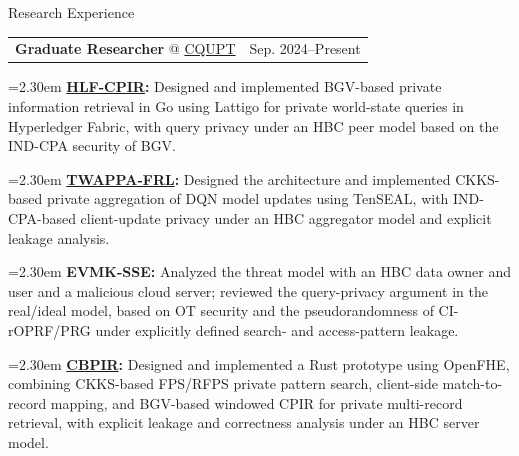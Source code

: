 \documentclass[11pt,a4paper]{article}
\makeatletter
\newcommand{\cvrow}[2]{%
  \noindent
  \begin{minipage}[t]{0.145\textwidth}
    \vspace{0pt}%
    \raggedright
    \fontsize{10.5}{12.5}\selectfont
    #1
  \end{minipage}%
  \hfill
  \begin{minipage}[t]{0.835\textwidth}
    \vspace{0pt}%
    #2
  \end{minipage}\par
}
\newcommand{\workentry}[2]{%
  \noindent
  \begin{tabularx}{\linewidth}
    {@{}X@{\hspace{0.8em}}r@{}}
    #1 & \small #2
  \end{tabularx}\par
  \vspace{0.15em}
}
\newcommand{\workproject}[1]{%
  \noindent
  \hangindent=2.30em
  \hangafter=1
  \hspace*{1.15em}\makebox[1.15em][l]{$\diamond$}#1\par
  \vspace{0.12em}
}
\makeatother
\begin{document}
\vspace{0.75em}

\cvrow{Research Experience}{%
  \workentry
    {\textbf{Graduate Researcher} @
    \href{https://www.cqupt.edu.cn/}{CQUPT}}
    {Sep. 2024--Present}

  \workproject{\textbf{\href{https://github.com/iasenovets/2_2_HLF_CPIR}{HLF-CPIR}:}
  Designed and implemented BGV-based private information retrieval in Go using
  Lattigo for private world-state queries in Hyperledger Fabric,
  with query privacy under an HBC peer model based on the IND-CPA security of BGV.}

  \workproject{\textbf{\href{https://github.com/hetiantian10/TWAPPA-FRL}{TWAPPA-FRL}:}
  Designed the architecture and implemented CKKS-based
  private aggregation of DQN model updates using TenSEAL, with IND-CPA-based
  client-update privacy under an HBC aggregator model and explicit leakage analysis.}

  \workproject{\textbf{EVMK-SSE:} Analyzed the threat model with an HBC data owner
  and user and a malicious cloud server; reviewed the query-privacy argument in the
  real/ideal model, based on OT security and the pseudorandomness of CI-rOPRF/PRG under explicitly
  defined search- and access-pattern leakage.}




  \workproject{\textbf{\href{https://github.com/iasenovets/content-based-pir}{CBPIR}:}
  Designed and implemented a Rust prototype using OpenFHE, combining
  CKKS-based FPS/RFPS private pattern search, client-side match-to-record
  mapping, and BGV-based windowed CPIR for private multi-record retrieval,
  with explicit leakage and correctness analysis under an HBC server model.}

}
\end{document}
